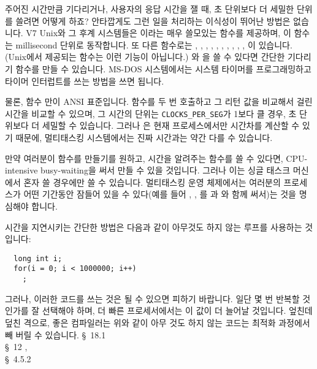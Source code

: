 \begin{faq}
	주어진 시간만큼 기다리거나, 사용자의 응답 시간을 잴 때,
	초 단위보다 더 세밀한 단위를 쓸려면 어떻게 하죠?
\A
	안타깝게도 그런 일을 처리하는 이식성이 뛰어난 방법은 없습니다.
	V7 Unix와 그 후계 시스템들은 이라는 매우 쓸모있는 함수를
	제공하며, 이 함수는 millisecond 단위로 동작합니다.
	또 다른 함수로는 , , ,
	, , , ,
	, , , 이
	있습니다.  (Unix에서 제공되는  함수는 이런 기능이
	아닙니다.) 와 을 쓸 수 있다면
	간단한 기다리기 함수를 만들 수 있습니다.
	MS-DOS 시스템에서는 시스템 타이머를 프로그래밍하고 타이머
	인터럽트를 쓰는 방법을 쓰면 됩니다.

	물론,  함수 만이 ANSI 표준입니다.
	 함수를 두 번 호출하고 그 리턴 값을 비교해서
	걸린 시간을 비교할 수 있으며, 그 시간의 단위는 \verb+CLOCKS_PER_SEG+가
	1보다 클 경우, 초 단위보다 더 세밀할 수 있습니다.  
	그러나 은 현재 프로세스에서만 시간차를 계산할 수 있기
	때문에, 멀티태스킹 시스템에서는 진짜 시간과는 약간 다를 수 있습니다.

	만약 여러분이  함수를 만들기를 원하고, 시간을
	알려주는 함수를 쓸 수 있다면, CPU-intensive busy-waiting을 써서
	만들 수 있을 것입니다.  그러나 이는 싱글 태스크 머신에서
	혼자 쓸 경우에만 쓸 수 있습니다.  멀티태스킹 운영 체제에서는
	여러분의 프로세스가 어떤 기간동안 잠들어 있을 수 있다(예를 들어
	, , 를 과
	와 함께 써서)는 것을 명심해야 합니다.

	시간을 지연시키는 간단한 방법은 다음과 같이 아무것도 하지 않는
	루프를 사용하는 것입니다:

\begin{verbatim}
  long int i;
  for(i = 0; i < 1000000; i++)
    ;
\end{verbatim}

	그러나, 이러한 코드를 쓰는 것은 될 수 있으면 피하기 바랍니다.
	일단 몇 번 반복할 것인가를 잘 선택해야 하며, 더 빠른
	프로세서에서는 이 값이 더 늘어날 것입니다.  엎친데 덮친 격으로,
	좋은 컴파일러는 위와 같이 아무 것도 하지 않는 코드는
	최적화 과정에서 빼 버릴 수 있습니다.
\R
	\cite{hs} \S\ 18.1  \\
	\cite{pcs} \S\ 12 ,  \\
	\cite{posix} \S\ 4.5.2
\end{faq}

